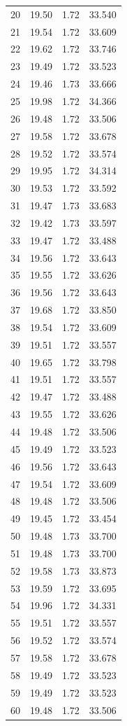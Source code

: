 \begin{table}[htbp]
\begin{tabular}{c S[table-format=2.2] S[table-format=1.2] S[table-format=2.3]}
20 & 19.50 & 1.72 & 33.540 \\
21 & 19.54 & 1.72 & 33.609 \\
22 & 19.62 & 1.72 & 33.746 \\
23 & 19.49 & 1.72 & 33.523 \\
24 & 19.46 & 1.73 & 33.666 \\
25 & 19.98 & 1.72 & 34.366 \\
26 & 19.48 & 1.72 & 33.506 \\
27 & 19.58 & 1.72 & 33.678 \\
28 & 19.52 & 1.72 & 33.574 \\
29 & 19.95 & 1.72 & 34.314 \\
30 & 19.53 & 1.72 & 33.592 \\
31 & 19.47 & 1.73 & 33.683 \\
32 & 19.42 & 1.73 & 33.597 \\
33 & 19.47 & 1.72 & 33.488 \\
34 & 19.56 & 1.72 & 33.643 \\
35 & 19.55 & 1.72 & 33.626 \\
36 & 19.56 & 1.72 & 33.643 \\
37 & 19.68 & 1.72 & 33.850 \\
38 & 19.54 & 1.72 & 33.609 \\
39 & 19.51 & 1.72 & 33.557 \\
40 & 19.65 & 1.72 & 33.798 \\
41 & 19.51 & 1.72 & 33.557 \\
42 & 19.47 & 1.72 & 33.488 \\
43 & 19.55 & 1.72 & 33.626 \\
44 & 19.48 & 1.72 & 33.506 \\
45 & 19.49 & 1.72 & 33.523 \\
46 & 19.56 & 1.72 & 33.643 \\
47 & 19.54 & 1.72 & 33.609 \\
48 & 19.48 & 1.72 & 33.506 \\
49 & 19.45 & 1.72 & 33.454 \\
50 & 19.48 & 1.73 & 33.700 \\
51 & 19.48 & 1.73 & 33.700 \\
52 & 19.58 & 1.73 & 33.873 \\
53 & 19.59 & 1.72 & 33.695 \\
54 & 19.96 & 1.72 & 34.331 \\
55 & 19.51 & 1.72 & 33.557 \\
56 & 19.52 & 1.72 & 33.574 \\
57 & 19.58 & 1.72 & 33.678 \\
58 & 19.49 & 1.72 & 33.523 \\
59 & 19.49 & 1.72 & 33.523 \\
60 & 19.48 & 1.72 & 33.506 \\
\bottomrule
\end{tabular}
\end{table}
